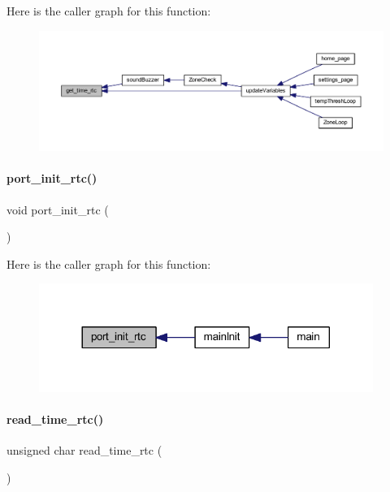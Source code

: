 Here is the caller graph for this function\+:
\nopagebreak
\begin{figure}[H]
\begin{center}
\leavevmode
\includegraphics[width=350pt]{a00014_a628868f4036626e8fa1b055bf56dc2f1_icgraph}
\end{center}
\end{figure}
\mbox{\label{a00014_a4144a5333b1a934957b78e4b2d0f8695}} 
\paragraph{port\+\_\+init\+\_\+rtc()}
{\footnotesize\ttfamily void port\+\_\+init\+\_\+rtc (\begin{DoxyParamCaption}{ }\end{DoxyParamCaption})}

Here is the caller graph for this function\+:
\nopagebreak
\begin{figure}[H]
\begin{center}
\leavevmode
\includegraphics[width=308pt]{a00014_a4144a5333b1a934957b78e4b2d0f8695_icgraph}
\end{center}
\end{figure}
\mbox{\label{a00014_add06d1f93d90576fa369c2401c1d4aed}} 
\paragraph{read\+\_\+time\+\_\+rtc()}
{\footnotesize\ttfamily unsigned char read\+\_\+time\+\_\+rtc (\begin{DoxyParamCaption}{ }\end{DoxyParamCaption})}

